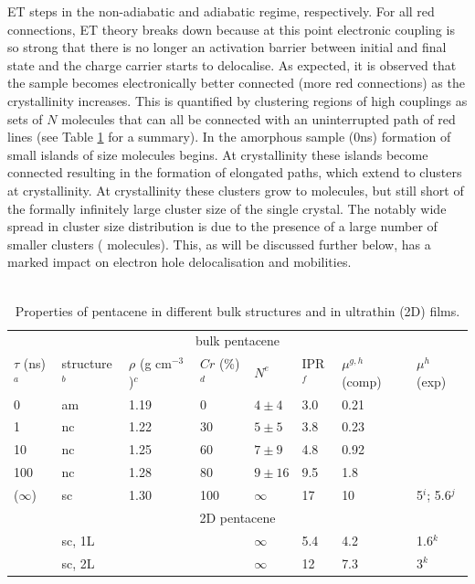 ET steps in the non-adiabatic and adiabatic regime, respectively. For all red connections, ET theory breaks down because at this point electronic coupling is so strong 
that there is no longer an activation barrier between initial and final state and the charge carrier starts to delocalise\cite{C6FD00107F}. As expected, it is observed that  
the sample becomes electronically better connected (more red connections) as the crystallinity increases.  
This is quantified by clustering regions of high couplings as sets of $N$ molecules that can all be connected with an uninterrupted path of red lines (see Table \ref{tab:fragments} for a summary).
In the amorphous sample (0ns) formation of small islands of size  molecules begins. At  crystallinity these islands become connected resulting in the formation of 
elongated  paths, which extend to  clusters at  crystallinity. At  crystallinity these clusters grow to  molecules, but still short of the formally infinitely 
large cluster size of the single crystal. The notably wide spread in cluster size distribution is due to the presence of a large number of smaller clusters ( molecules). 
This, as will be discussed further below, has a marked impact on electron hole delocalisation and mobilities. \\
\\
\begin{table}
 \caption{\label{tab:fragments}Properties of pentacene in different bulk structures and in ultrathin (2D) films.}
\begin{center}
  \begin{tabular}[htbp]{@{}llllllll@{}}
    \hline
     \multicolumn{8}{c}{bulk pentacene} \\
    $\tau$ (ns)$^a$ & structure$^b$ & $\rho$ (g cm$^{-3}$)$^c$ &  $Cr$ (\%)$^d$  &  $N^e$   & IPR$^f$  & $\mu^{g,h}$ (comp) & $\mu^h$ (exp) \\
    \hline
    0       & am & 1.19   & 0     & $4\pm4$      & 3.0 & 0.21 &       \\
    1       & nc & 1.22   & 30   & $5\pm5$      & 3.8	 & 0.23 &       \\
    10     & nc & 1.25   & 60   & $7\pm9$    & 4.8 & 0.92   &        \\
    100   & nc & 1.28  & 80   & $9\pm16$  & 9.5 & 1.8   &        \\
 ($\infty$) & sc &  1.30  & 100 & $\infty$           & 17 & 10 & 5$^i$; 5.6$^j$ \\
    \hline
    \multicolumn{8}{c}{2D pentacene} \\
             & sc, 1L &        &      &  $\infty$ &       5.4   &  4.2 & 1.6$^k$\\
             & sc, 2L &        &     &  $\infty$ &         12 & 7.3 & 3$^k$ \\
    \hline
  \end{tabular}
\end{center}
\end{table}
